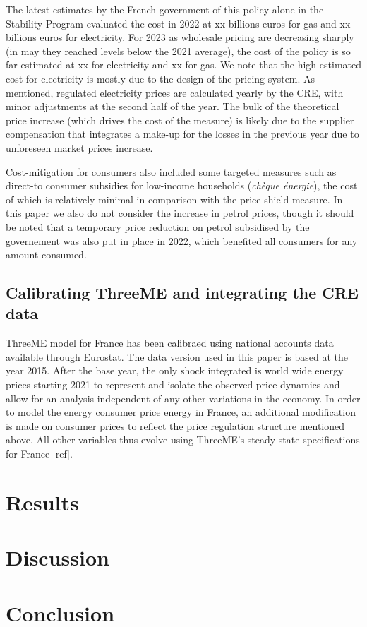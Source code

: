 \documentclass[
  letterpaper,
  DIV=11,
  numbers=noendperiod]{scrartcl}
\begin{document}
The latest estimates by the French government of this policy alone in
the Stability Program evaluated the cost in 2022 at xx billions euros
for gas and xx billions euros for electricity. For 2023 as wholesale
pricing are decreasing sharply (in may they reached levels below the
2021 average), the cost of the policy is so far estimated at xx for
electricity and xx for gas. We note that the high estimated cost for
electricity is mostly due to the design of the pricing system. As
mentioned, regulated electricity prices are calculated yearly by the
CRE, with minor adjustments at the second half of the year. The bulk of
the theoretical price increase (which drives the cost of the measure) is
likely due to the supplier compensation that integrates a make-up for
the losses in the previous year due to unforeseen market prices
increase.

Cost-mitigation for consumers also included some targeted measures such
as direct-to consumer subsidies for low-income households (\emph{chèque
énergie}), the cost of which is relatively minimal in comparison with
the price shield measure. In this paper we also do not consider the
increase in petrol prices, though it should be noted that a temporary
price reduction on petrol subsidised by the governement was also put in
place in 2022, which benefited all consumers for any amount consumed.

\hypertarget{calibrating-threeme-and-integrating-the-cre-data}{%
\subsection{Calibrating ThreeME and integrating the CRE
data}\label{calibrating-threeme-and-integrating-the-cre-data}}

ThreeME model for France has been calibraed using national accounts data
available through Eurostat. The data version used in this paper is based
at the year 2015. After the base year, the only shock integrated is
world wide energy prices starting 2021 to represent and isolate the
observed price dynamics and allow for an analysis independent of any
other variations in the economy. In order to model the energy consumer
price energy in France, an additional modification is made on consumer
prices to reflect the price regulation structure mentioned above. All
other variables thus evolve using ThreeME's steady state specifications
for France {[}ref{]}.

\hypertarget{results}{%
\section{Results}\label{results}}

\hypertarget{discussion}{%
\section{Discussion}\label{discussion}}

\hypertarget{conclusion}{%
\section{Conclusion}\label{conclusion}}
\end{document}
